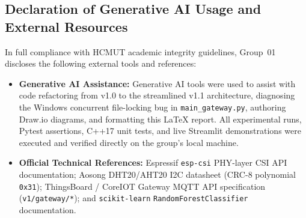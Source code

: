 \documentclass{hcmut-report}
\begin{document}
\subsection{Declaration of Generative AI Usage and External Resources}
In full compliance with HCMUT academic integrity guidelines, Group~01 discloses the following external tools and references:
\begin{itemize}
  \item \textbf{Generative AI Assistance:} Generative AI tools were used to assist with code refactoring from v1.0 to the streamlined v1.1 architecture, diagnosing the Windows concurrent file-locking bug in \texttt{main\_gateway.py}, authoring Draw.io diagrams, and formatting this LaTeX report. All experimental runs, Pytest assertions, C++17 unit tests, and live Streamlit demonstrations were executed and verified directly on the group's local machine.
  \item \textbf{Official Technical References:} Espressif \texttt{esp-csi} PHY-layer CSI API documentation; Aosong DHT20/AHT20 I2C datasheet (CRC-8 polynomial \texttt{0x31}); ThingsBoard / CoreIOT Gateway MQTT API specification (\texttt{v1/gateway/*}); and \texttt{scikit-learn} \texttt{RandomForestClassifier} documentation.
\end{itemize}
\end{document}
